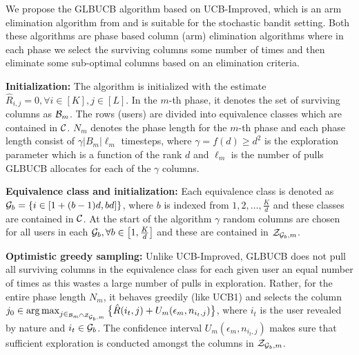 

We propose the GLBUCB algorithm based on UCB-Improved, which is an arm elimination algorithm from \citet{auer2010ucb} and is suitable for the stochastic bandit setting. Both these algorithms are phase based column (arm) elimination algorithms where in each phase we select the surviving columns some number of times  and then eliminate some sub-optimal columns based on an elimination criteria. 

\textbf{Initialization:} The algorithm is initialized with the estimate $\hat{R}_{i,j}=0, \forall i\in[K], j\in[L]$. In the $m$-th phase, it denotes  the set of surviving columns as $\mathcal{B}_m$. The rows (users) are divided into equivalence classes which are contained in $\mathcal{C}$.  $N_m$ denotes the phase length for the $m$-th phase and each phase length consist of $\gamma |B_m| \ell_m $ timesteps, where $ \gamma = f(d) \geq d^2 $ is the exploration parameter which is a function of the rank $d$ and $\ell_m $ is the number of pulls GLBUCB allocates for each of the $\gamma$ columns. 

\textbf{Equivalence class and initialization:} Each equivalence class is denoted as $\mathcal{G}_b = \left\lbrace i\in \left[1+(b-1)d, bd\right]\right\rbrace$, where $b$ is indexed from $1,2,\ldots , \frac{K}{d}$ and these classes are contained in $\mathcal{C}$. At the start of the algorithm $\gamma$ random columns are chosen for all users in each $\mathcal{G}_b,  \forall b\in \left[ 1, \frac{K}{d}\right]$ and these are contained in $\mathcal{Z}_{\mathcal{G}_b,m}$.

\textbf{Optimistic greedy sampling:} Unlike UCB-Improved, GLBUCB does not pull all surviving columns in the equivalence class for each given user an equal number of times as this wastes a large number of pulls in exploration. Rather, for the entire phase length $N_m$, it behaves greedily (like UCB1) and selects the column $j_0 \in \mathop{\rm arg\,max}_{j\in_{\mathcal{B}_m\cap \mathcal{Z}_{\mathcal{G}_b,m}}}\big\lbrace \hat{R}(i_t,j)  + U_m(\epsilon_m, n_{i_t,j})\big\rbrace $, where $i_t$ is the user revealed by nature and $i_t\in \mathcal{G}_b$. The confidence interval $ U_m(\epsilon_m, n_{i_t,j})$ makes sure that sufficient exploration is conducted amongst the columns in $\mathcal{Z}_{\mathcal{G}_b,m}$. 

